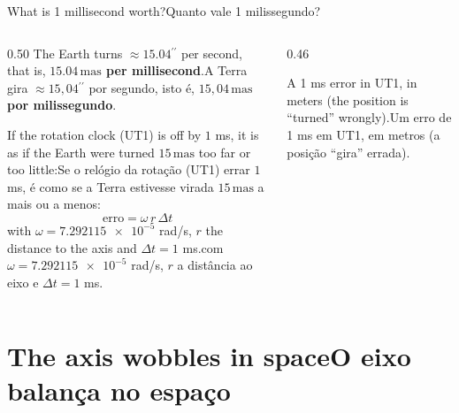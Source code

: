 \documentclass[aspectratio=169,11pt]{beamer}
\newcommand{\tr}[2]{\ifEN#2\else#1\fi}
\newcommand{\bnum}[1]{\textbf{\textcolor{mTeal}{#1}}}
\newcommand{\asec}{\ensuremath{{}^{\prime\prime}}}
\newcommand{\mas}{\ensuremath{\,\mathrm{mas}}\xspace}
\begin{document}
\begin{frame}{\tr{Quanto vale 1 milissegundo?}{What is 1 millisecond worth?}}
  \begin{columns}[T]
    \begin{column}{0.50\textwidth}
      \small
      \tr{A Terra gira $\approx 15{,}04\asec$ por segundo, isto é, \bnum{$15{,}04\mas$ por milissegundo}.}{The Earth turns $\approx 15.04\asec$ per second, that is, \bnum{$15.04\mas$ per millisecond}.}
      \medskip

      \tr{Se o relógio da rotação (UT1) errar $1$ ms, é como se a Terra estivesse virada $15\mas$ a mais ou a menos:}{If the rotation clock (UT1) is off by $1$ ms, it is as if the Earth were turned $15\mas$ too far or too little:}
      \[ \text{erro} = \omega \, r \, \Delta t \]
      \tr{com $\omega = \num{7.292115e-5}$ rad/s, $r$ a distância ao eixo e $\Delta t = 1$ ms.}{with $\omega = \num{7.292115e-5}$ rad/s, $r$ the distance to the axis and $\Delta t = 1$ ms.}
    \end{column}
    \begin{column}{0.46\textwidth}
      \centering
      \par\smallskip
      {\scriptsize\textcolor{mStoneMid}{\tr{Um erro de 1 ms em UT1, em metros (a posição ``gira'' errada).}{A 1 ms error in UT1, in meters (the position is ``turned'' wrongly).}}}
    \end{column}
  \end{columns}
\end{frame}

\section{\tr{O eixo balança no espaço}{The axis wobbles in space}}
\end{document}
